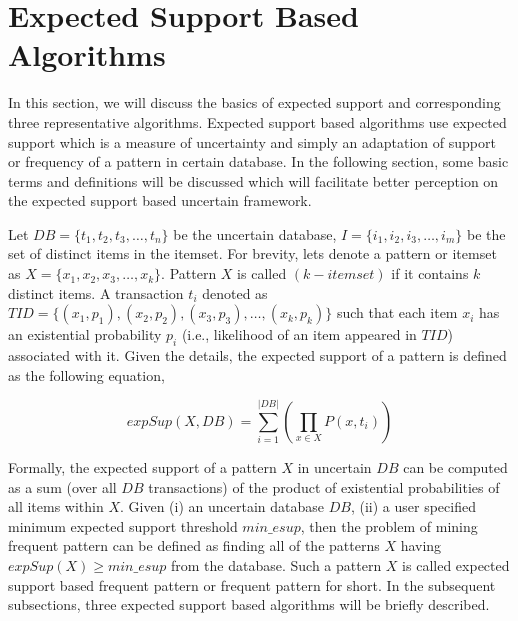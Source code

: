 \section{Expected Support Based Algorithms}
In this section, we will discuss the basics of expected support and corresponding three representative algorithms. Expected support based algorithms use expected support which is a measure of uncertainty and simply an adaptation of support or frequency of a pattern in certain database. In the following section, some basic terms and definitions will be discussed which will facilitate better perception on the expected support based uncertain framework.

Let $DB = \{t_1, t_2, t_3, \ldots ,t_n\}$ be the uncertain database, $I = \{i_1, i_2, i_3,  \ldots ,i_m\}$ be the set of distinct items in the itemset. For brevity, lets denote a pattern or itemset as $X = \{x_1, x_2, x_3, \ldots ,x_k\}$. Pattern $X$ is called $(k-itemset)$ if it contains $k$ distinct items. A  transaction $t_i$ denoted as $TID = \{ (x_1, p_1), (x_2, p_2), (x_3, p_3), \ldots ,(x_k,p_k)\}$ such that each item $x_i$ has an existential probability $p_i$ (i.e., likelihood of an item appeared in $TID$) associated with it. Given the details, the expected support of a pattern is defined as the following equation,

\[
 expSup(X, DB) = \sum_{i=1}^{|DB|} ( \prod_{x \in X} P(x, t_i)) 
\]

Formally, the expected support of a pattern $X$ in uncertain $DB$ can be computed as a sum (over all $DB$ transactions) of the product of existential probabilities of all items within $X$. Given (i) an uncertain database $DB$, (ii) a user specified minimum expected support threshold $min\_esup$, then the problem of mining frequent pattern can be defined as finding all of the patterns $X$ having $expSup(X) \geq min\_esup$ from the database. Such a pattern $X$ is called expected support based frequent pattern or frequent pattern for short. In the subsequent subsections, three expected support based algorithms will be briefly described.

